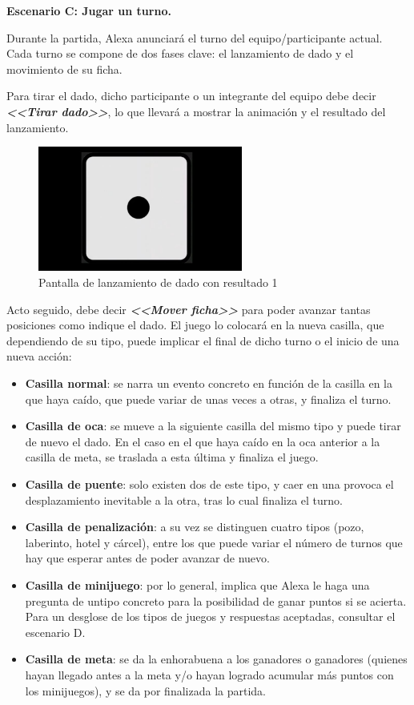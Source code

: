 \vspace{0.5cm}

\textbf{Escenario C: Jugar un turno.}

Durante la partida, Alexa anunciará el turno del equipo/participante actual. Cada turno se compone de dos fases clave: el lanzamiento de dado y el movimiento de su ficha.

Para tirar el dado, dicho participante o un integrante del equipo debe decir \textbf{\textit{<<Tirar dado>>}}, lo que llevará a mostrar la animación y el resultado del lanzamiento.

\begin{figure}[H]
	\centering
	\includegraphics[width=0.6\textwidth]{imgs/interfaz-3.JPG}
	\caption{Pantalla de lanzamiento de dado con resultado 1}
	\label{fig:manual-3}
\end{figure}

Acto seguido, debe decir \textbf{\textit{<<Mover ficha>>}} para poder avanzar tantas posiciones como indique el dado. El juego lo colocará en la nueva casilla, que dependiendo de su tipo, puede implicar el final de dicho turno o el inicio de una nueva acción:
 \begin{itemize}
 	\item \textbf{Casilla normal}: se narra un evento concreto en función de la casilla en la que haya caído, que puede variar de unas veces a otras, y finaliza el turno.
 	\item \textbf{Casilla de oca}: se mueve a la siguiente casilla del mismo tipo y puede tirar de nuevo el dado. En el caso en el que haya caído en la oca anterior a la casilla de meta, se traslada a esta última y finaliza el juego.
 	\item \textbf{Casilla de puente}: solo existen dos de este tipo, y caer en una provoca el desplazamiento inevitable a la otra, tras lo cual finaliza el turno. 
 	\item \textbf{Casilla de penalización}: a su vez se distinguen cuatro tipos (pozo, laberinto, hotel y cárcel), entre los que puede variar el número de turnos que hay que esperar antes de poder avanzar de nuevo.
 	\item \textbf{Casilla de minijuego}: por lo general, implica que Alexa le haga una pregunta de untipo concreto para la posibilidad de ganar puntos si se acierta. Para un desglose de los tipos de juegos y respuestas aceptadas, consultar el escenario D.
 	\item \textbf{Casilla de meta}: se da la enhorabuena a los ganadores o ganadores (quienes hayan llegado antes a la meta y/o hayan logrado acumular más puntos con los minijuegos), y se da por finalizada la partida.
 \end{itemize}

